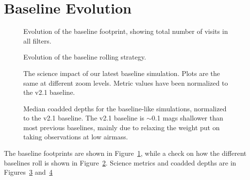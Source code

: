\section{Baseline Evolution}


\begin{figure}
\caption{Evolution of the baseline footprint, showing total number of visits in all filters.\label{fig:baseline_foot}}
\end{figure}

\begin{figure}
\caption{Evolution of the baseline rolling strategy. \label{fig:baseline_roll}}
\end{figure}

\begin{figure}
\caption{The science impact of our latest baseline simulation. Plots are the same at different zoom levels. Metric values have been normalized to the v2.1 baseline.  \label{fig:baseline2_radar}}
\end{figure}

\begin{figure}
\caption{Median coadded depths for the baseline-like simulations, normalized to the v2.1 baseline. The v2.1 baseline is $\sim$0.1 mags shallower than most previous baselines, mainly due to relaxing the weight put on taking observations at low airmass. \label{fig:baseline_mags}}
\end{figure}

The baseline footprints are shown in Figure~\ref{fig:baseline_foot}, while a check on how the different baselines roll is shown in Figure~\ref{fig:baseline_roll}. Science metrics and coadded depths are in Figures~\ref{fig:baseline2_radar} and~\ref{fig:baseline_mags}

